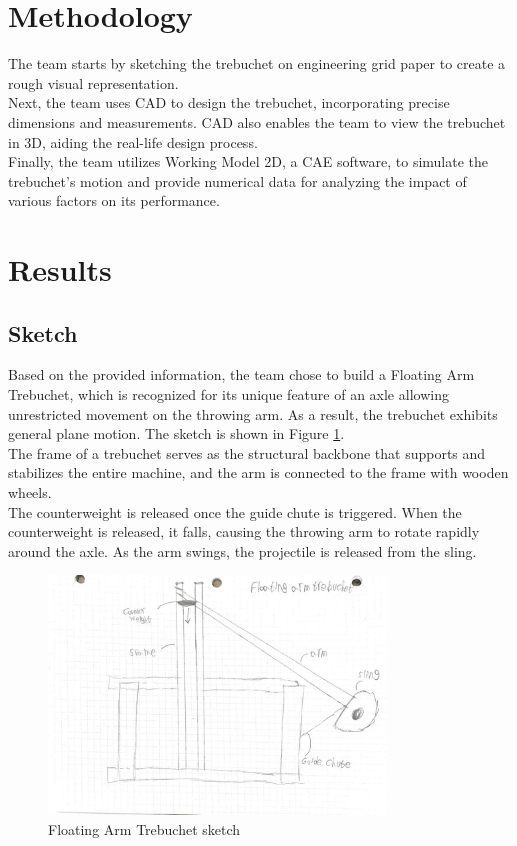 \documentclass[12pt, titlepage]{article}
\begin{document}
    \section{Methodology}
    The team starts by sketching the trebuchet on engineering grid 
    paper to create a rough visual representation.\\[10pt] 
    Next, the team uses CAD to design the trebuchet, incorporating
    precise dimensions and measurements. CAD also enables the team to view the trebuchet in 3D, aiding the real-life design process.\\[10pt]
    Finally, the team utilizes Working Model 2D, a CAE software, to simulate the trebuchet's motion and provide numerical data for analyzing the impact of various factors on its performance.
    \newpage
    \section{Results}
    \subsection{Sketch}
    Based on the provided information, the team chose to build a Floating Arm 
    Trebuchet, which is recognized for its unique feature of an axle allowing 
    unrestricted movement on the throwing arm. As a result, the trebuchet 
    exhibits general plane motion. The sketch is shown in Figure \ref{sketch}.\\[10pt]
    The frame of a trebuchet serves as the structural backbone that supports 
    and stabilizes the entire machine, and the arm is connected to the frame
    with wooden wheels.\\[10pt]
    The counterweight is released once the guide chute is triggered.
    When the counterweight is released, it falls, causing the throwing arm 
    to rotate rapidly around the axle. As the arm swings, the projectile 
    is released from the sling.
    \begin{figure}[t]                                  
    \centering
    \includegraphics[width=0.8\textwidth]{sketch.jpeg}
    \caption{Floating Arm Trebuchet sketch\label{sketch}}
    \end{figure}
    \newpage
\end{document}
